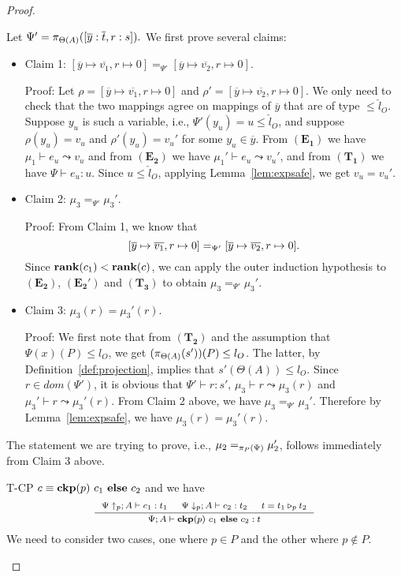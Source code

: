 {{{\begin{proof}
\begin{ProofEnumDesc}
Let $\Psi' = \app{[\overline{y} : \overline{t}, r : s]}{\Theta(A)}.$
We first prove several claims:
\begin{itemize}
\item Claim 1:
$[\overline{y} \mapsto \overline{v_1}, r \mapsto 0]
=_{\Psi'} [\overline{y} \mapsto \overline{v_2}, r\mapsto 0].$

Proof:
Let $\rho = [\overline{y} \mapsto \overline{v_1}, r \mapsto 0]$
and $\rho' = [\overline{y} \mapsto \overline{v_2}, r \mapsto 0]$.
We only need to check that the two mappings
agree on mappings of $\overline{y}$ that are of type $\leq \hat{l}_O.$
Suppose $y_u$ is such a variable, i.e., $\Psi'(y_u) = u \leq \hat{l}_O$,
and suppose $\rho(y_u) = v_u$ and
$\rho'(y_u) = v_u'$ for some $y_u \in \overline{y}.$
From $(\mathbf{E_1})$ we have
$\mu_1 \vdash e_u \leadsto v_u$
and from $(\mathbf{E_2})$
we have $\mu_1' \vdash e_u \leadsto v_u'$,
and from $(\mathbf{T_1})$ we have $\Psi \vdash e_u : u.$
Since $u \leq \hat{l}_O$, applying Lemma~\ref{lem:expsafe},
we get $v_u = v_u'$.


\item Claim 2: $\mu_3 =_{\Psi'} \mu_3'.$

Proof: From Claim 1, we know that
$$\myeqsize[\overline{y} \mapsto \overline{v_1}, r \mapsto 0]
=_{\Psi'} [\overline{y} \mapsto \overline{v_2}, r \mapsto 0].$$
Since $\rank{c_1}<\rank{c}$, we can apply the outer induction
hypothesis to $(\mathbf{E_2})$, $(\mathbf{E_2'})$
and $(\mathbf{T_3})$ to obtain
$\mu_3 =_{\Psi'} \mu_3'.$

\item Claim 3: $\mu_3(r) = \mu_3'(r).$

Proof: We first note that from $(\mathbf{T_2})$
and the assumption that $\Psi(x)(P) \leq l_O$, we get
$(\app{s'}{\Theta(A)})(P) \leq l_O$.
The latter, by Definition~\ref{def:projection}, implies  that $s'(\Theta(A)) \leq l_O.$
Since $r \in dom(\Psi')$, it is obvious that
$\Psi' \vdash r : s'$,
$\mu_3 \vdash r \leadsto \mu_3(r)$
and $\mu_3' \vdash r \leadsto \mu_3'(r).$
From Claim 2 above, we have $\mu_3 =_{\Psi'} \mu_3'$.
Therefore by Lemma~\ref{lem:expsafe}, we have
$\mu_3(r) = \mu_3'(r).$
\end{itemize}
The statement we are trying to prove, i.e., $\mu_2 =_{\app{\Psi}{P}} \mu_2'$,
follows immediately from Claim 3 above.
\item[T-CP] $c\equiv\lcCP{p}{c_1}{c_2}$ and we have
$$\myeqsize
\inference
{\Psi\uparrow_{p} ; A \vdash c_1 : t_1 &
\Psi\downarrow_{p} ; A\vdash c_2 : t_2 &
t=\omerge {p} {t_1} {t_2}}
{\Psi; A\vdash \lcCP{p}{c_1}{c_2} : t}
$$
We need to consider two cases, one where $p \in P$
and the other where $p \not \in P$.


\end{ProofEnumDesc}
\end{proof}}}}
